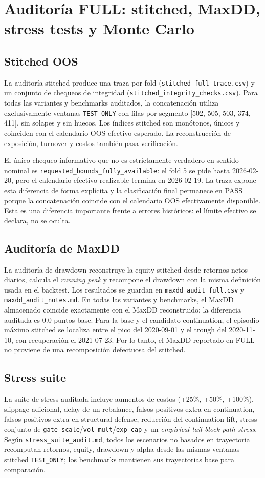 \documentclass[11pt]{article}
\begin{document}
\section{Auditor\'ia FULL: stitched, MaxDD, stress tests y Monte Carlo}
\subsection*{Stitched OOS}
La auditor\'ia stitched produce una traza por fold (\texttt{stitched\_full\_trace.csv}) y un conjunto de chequeos de integridad (\texttt{stitched\_integrity\_checks.csv}). Para todas las variantes y benchmarks auditados, la concatenaci\'on utiliza exclusivamente ventanas \texttt{TEST\_ONLY} con filas por segmento [502, 505, 503, 374, 411], sin solapes y sin huecos. Los \'indices stitched son mon\'otonos, \'unicos y coinciden con el calendario OOS efectivo esperado. La reconstrucci\'on de exposici\'on, turnover y costos tambi\'en pasa verificaci\'on.

El \'unico chequeo informativo que no es estrictamente verdadero en sentido nominal es \texttt{requested\_bounds\_fully\_available}: el fold 5 se pide hasta 2026-02-20, pero el calendario efectivo realizable termina en 2026-02-19. La traza expone esta diferencia de forma expl\'icita y la clasificaci\'on final permanece en PASS porque la concatenaci\'on coincide con el calendario OOS efectivamente disponible. Esta es una diferencia importante frente a errores hist\'oricos: el l\'imite efectivo se declara, no se oculta.

\subsection*{Auditor\'ia de MaxDD}
La auditor\'ia de drawdown reconstruye la equity stitched desde retornos netos diarios, calcula el \textit{running peak} y recompone el drawdown con la misma definici\'on usada en el backtest. Los resultados se guardan en \texttt{maxdd\_audit\_full.csv} y \texttt{maxdd\_audit\_notes.md}. En todas las variantes y benchmarks, el MaxDD almacenado coincide exactamente con el MaxDD reconstruido; la diferencia auditada es 0.0 puntos base. Para la base y el candidato continuation, el episodio m\'aximo stitched se localiza entre el pico del 2020-09-01 y el trough del 2020-11-10, con recuperaci\'on el 2021-07-23. Por lo tanto, el MaxDD reportado en FULL no proviene de una recomposici\'on defectuosa del stitched.

\subsection*{Stress suite}
La suite de stress auditada incluye aumentos de costos (+25\%, +50\%, +100\%), slippage adicional, delay de un rebalance, falsos positivos extra en continuation, falsos positivos extra en structural defense, reducci\'on del continuation lift, stress conjunto de \texttt{gate\_scale}/\texttt{vol\_mult}/\texttt{exp\_cap} y un \textit{empirical tail block path stress}. Seg\'un \texttt{stress\_suite\_audit.md}, todos los escenarios no basados en trayectoria recomputan retornos, equity, drawdown y alpha desde las mismas ventanas stitched \texttt{TEST\_ONLY}; los benchmarks mantienen sus trayectorias base para comparaci\'on.
\end{document}
